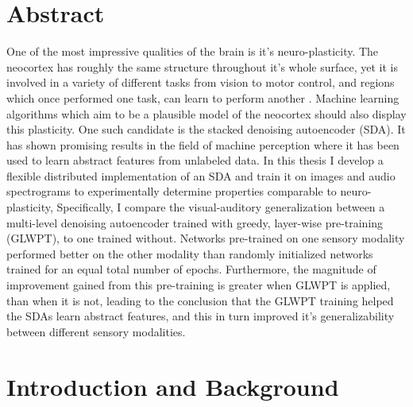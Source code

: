\documentclass[12pt]{article}
\begin{document}
\section{Abstract}
\label{Abstract}
\begin{doublespacing}

One of the most impressive qualities of the brain is it's neuro-plasticity. The neocortex has roughly the same structure throughout it's whole surface, yet it is involved in a variety of different tasks from vision to motor control, and regions which once performed one task, can learn to perform another \cite{hawkins2004intelligence}. Machine learning algorithms which aim to be a plausible model of the neocortex should also display this plasticity. One such candidate is the stacked denoising autoencoder (SDA). It has shown promising results in the field of machine perception where it has been used to learn abstract features from unlabeled data. \cite{larochelle2007empirical, le2011building, vincent2008extracting} In this thesis I develop a flexible distributed implementation of an SDA and train it on images and audio spectrograms to experimentally determine properties comparable to neuro-plasticity, Specifically, I compare the visual-auditory generalization between a multi-level denoising autoencoder trained with greedy, layer-wise pre-training (GLWPT), to one trained without. Networks pre-trained on one sensory modality performed better on the other modality than randomly initialized networks trained for an equal total number of epochs. Furthermore, the magnitude of improvement gained from this pre-training is greater when GLWPT is applied, than when it is not, leading to the conclusion that the GLWPT training helped the SDAs learn abstract features, and this in turn improved it's generalizability between different sensory modalities. 

\section{Introduction and Background}


\end{doublespacing}
\end{document}
